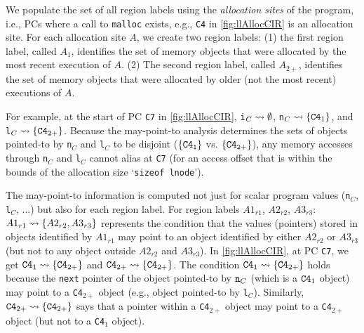 We populate the set of all region labels using the
{\em allocation
sites} of the program, i.e., PCs where a call to
{\tt malloc} exists, e.g., {\tt C4}
in \cref{fig:llAllocCIR} is an allocation site.
For each allocation site $A$, we create
two region labels: (1) the first region label, called $A_1$,
identifies the set of memory
objects that were allocated by the most recent execution of $A$. (2) The second
region label, called $A_{2+}$, identifies
the set of memory objects that were allocated by older (not the most
recent) executions of $A$.

For example, at the start of PC {\tt C7} in \cref{fig:llAllocCIR},
{\tt i}$_C\rightsquigarrow{}\emptyset$,
{\tt n}$_C\rightsquigarrow{}\{{\tt C4}_1\}$,
and {\tt l}$_C\rightsquigarrow{}\{{\tt C4}_{2+}\}$.
Because the may-point-to analysis determines the
sets of objects pointed-to by {\tt n}$_C$ and {\tt l}$_C$ to
be disjoint ($\{{\tt C4_{1}}\}$ vs. $\{{\tt C4_{2+}}\}$), any
memory accesses through {\tt n}$_C$ and {\tt l}$_C$
cannot alias at {\tt C7} (for an access
offset that is within the bounds of
the allocation size `{\tt sizeof lnode}').

The may-point-to information is computed not
just for scalar program values ({\tt n}$_C$,
{\tt l}$_C$, ...) but also for each region label.
For region labels $A1_{r1}$, $A2_{r2}$, $A3_{r3}$:
$A1_{r1}\rightsquigarrow{}\{A2_{r2},A3_{r3}\}$ represents
the condition that the values (pointers) stored
in objects identified
by $A1_{r1}$ may point to an object identified by
either $A2_{r2}$ or $A3_{r3}$ (but not to any object
outside $A2_{r2}$ and $A3_{r3}$).
In \cref{fig:llAllocCIR}, at PC {\tt C7}, we
get
${\tt C4}_{1}\rightsquigarrow{}\{{\tt C4}_{2+}\}$ and
${\tt C4}_{2+}\rightsquigarrow{}\{{\tt C4}_{2+}\}$.
The condition
${\tt C4}_{1}\rightsquigarrow{}\{{\tt C4}_{2+}\}$
holds because the {\tt next} pointer of the object
pointed-to by ${\tt n}_C$ (which
is a ${\tt C4}_1$ object) may point to
a {\tt C4}$_{2+}$ object (e.g., object pointed-to
by {\tt l}$_C$).
Similarly, ${\tt C4}_{2+}\rightsquigarrow{}\{{\tt C4}_{2+}\}$
says that a pointer within a {\tt C4}$_{2+}$ object
may point to a {\tt C4}$_{2+}$
object (but not to a {\tt C4}$_1$ object).

